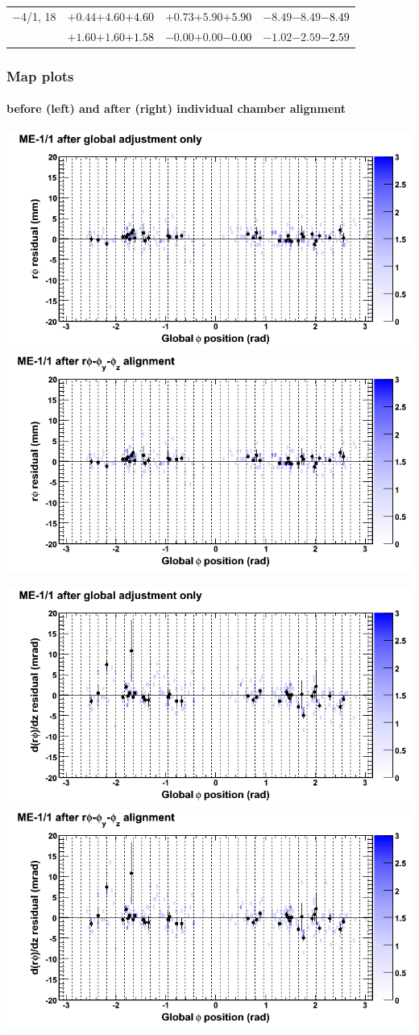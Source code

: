 \documentclass[compress]{beamer}
\begin{document}
\begin{frame}
\begin{tabular}{r | c | c | c}
$-$4/1, 18 & $+0.44$\hspace{0.1 cm}$+4.60$\hspace{0.1 cm}\textcolor{black}{$+4.60$} & $+0.73$\hspace{0.1 cm}$+5.90$\hspace{0.1 cm}\textcolor{black}{$+5.90$} & $-8.49$\hspace{0.1 cm}$-8.49$\hspace{0.1 cm}\textcolor{black}{$-8.49$} \\
           & $+1.60$\hspace{0.1 cm}$+1.60$\hspace{0.1 cm}\textcolor{black}{$+1.58$} & $-0.00$\hspace{0.1 cm}$+0.00$\hspace{0.1 cm}\textcolor{black}{$-0.00$} & $-1.02$\hspace{0.1 cm}$-2.59$\hspace{0.1 cm}\textcolor{black}{$-2.59$} \\
\end{tabular}
\end{frame}

\begin{frame}
\frametitle{Map plots}
\framesubtitle{before (left) and after (right) individual chamber alignment}
\includegraphics[width=0.5\linewidth]{ringmapplots_3dof/before_CSCvsphi_mem11_x.png} \includegraphics[width=0.5\linewidth]{ringmapplots_3dof/after_CSCvsphi_mem11_x.png}

\includegraphics[width=0.5\linewidth]{ringmapplots_3dof/before_CSCvsphi_mem11_dxdz.png} \includegraphics[width=0.5\linewidth]{ringmapplots_3dof/after_CSCvsphi_mem11_dxdz.png}
\end{frame}
\end{document}

